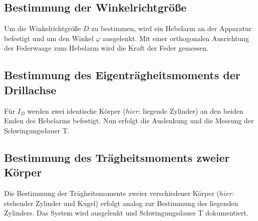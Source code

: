 \subsection{Bestimmung der Winkelrichtgröße}
\label{sec:Durchführung}
Um die Winkelrichtgröße $D$ zu bestimmen, wird ein Hebelarm an der Apparatur
befestigt und um den Winkel $\varphi$ ausgelenkt. Mit einer orthogonalen
Ausrichtung der Federwaage zum Hebelarm wird die Kraft der Feder
gemessen.
\subsection{Bestimmung des Eigenträgheitsmoments der Drillachse}
\label{sec:Durchführung}
Für $I_D$ werden zwei identische Körper ($hier$: liegende Zylinder) an den
beiden Enden des Hebelarms befestigt. Nun erfolgt die Auslenkung und die
Messung der Schwingungsdauer T.
\subsection{Bestimmung des Trägheitsmoments zweier Körper}
\label{sec:Durchführung}
Die Bestimmung der Trägheitsmomente zweier verschiedener Körper ($hier$:
stehender Zylinder und Kugel) erfolgt analog zur Bestimmung des liegenden
Zylinders. Das System wird ausgelenkt und Schwingungsdauer T dokumentiert.
